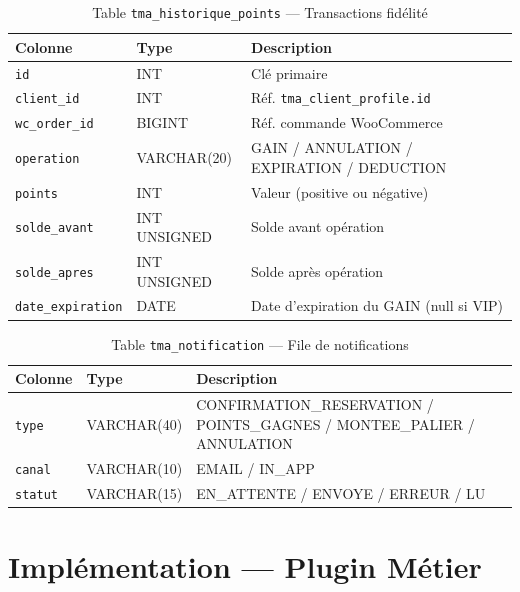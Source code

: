 \documentclass[12pt,a4paper]{report}
\begin{document}
\begin{table}[H]
\centering
\caption{Table \texttt{tma\_historique\_points} --- Transactions fid\'elit\'e}
\begin{tabularx}{\linewidth}{llX}
  \toprule
  \textbf{Colonne} & \textbf{Type} & \textbf{Description} \\
  \midrule
  \texttt{id}             & INT           & Cl\'e primaire \\
  \texttt{client\_id}     & INT           & R\'ef. \texttt{tma\_client\_profile.id} \\
  \texttt{wc\_order\_id}  & BIGINT        & R\'ef. commande WooCommerce \\
  \texttt{operation}      & VARCHAR(20)   & GAIN / ANNULATION / EXPIRATION / DEDUCTION \\
  \texttt{points}         & INT           & Valeur (positive ou n\'egative) \\
  \texttt{solde\_avant}   & INT UNSIGNED  & Solde avant op\'eration \\
  \texttt{solde\_apres}   & INT UNSIGNED  & Solde apr\`es op\'eration \\
  \texttt{date\_expiration} & DATE        & Date d'expiration du GAIN (null si VIP) \\
  \bottomrule
\end{tabularx}
\end{table}

\begin{table}[H]
\centering
\caption{Table \texttt{tma\_notification} --- File de notifications}
\begin{tabularx}{\linewidth}{llX}
  \toprule
  \textbf{Colonne} & \textbf{Type} & \textbf{Description} \\
  \midrule
  \texttt{type}   & VARCHAR(40) & CONFIRMATION\_RESERVATION / POINTS\_GAGNES / MONTEE\_PALIER / ANNULATION \\
  \texttt{canal}  & VARCHAR(10) & EMAIL / IN\_APP \\
  \texttt{statut} & VARCHAR(15) & EN\_ATTENTE / ENVOYE / ERREUR / LU \\
  \bottomrule
\end{tabularx}
\end{table}

\chapter{Impl\'ementation --- Plugin M\'etier}
\end{document}
